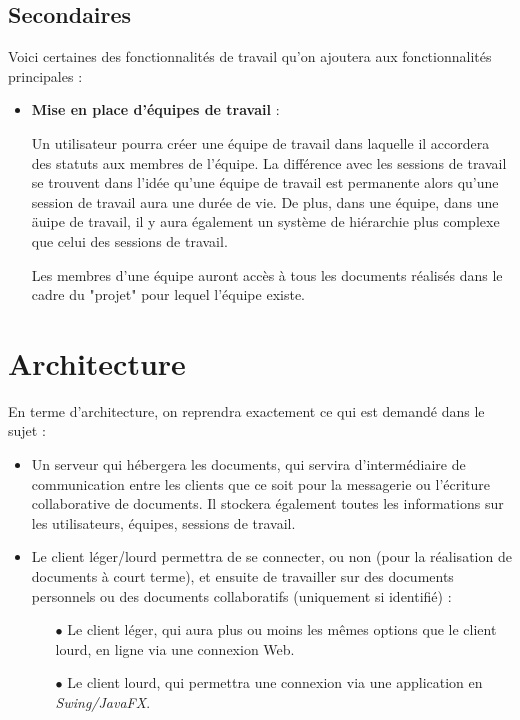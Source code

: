 	\newpage
	\subsection{Secondaires}
	
		Voici certaines des fonctionnalités de travail qu'on ajoutera aux fonctionnalités principales : \par 
		
		\begin{itemize}
		
			\item \textbf{Mise en place d'équipes de travail} : \par
			Un utilisateur pourra créer une équipe de travail dans laquelle il accordera des statuts aux membres de l'équipe. La différence avec les sessions de travail se trouvent dans l'idée qu'une équipe de travail est permanente alors qu'une session de travail aura une durée de vie. De plus, dans une équipe, dans une äuipe de travail, il y aura également un système de hiérarchie plus complexe que celui des sessions de travail. \par
			Les membres d'une équipe auront accès à tous les documents réalisés dans le cadre du "projet" pour lequel l'équipe existe.
		\end{itemize}
		
		\section{Architecture}
		
		En terme d'architecture, on reprendra exactement ce qui est demandé dans le sujet :
		
		\begin{itemize}
		
			\item Un serveur qui hébergera les documents, qui servira d'intermédiaire de communication entre les clients que ce soit pour la messagerie ou l'écriture collaborative de documents. Il stockera également toutes les informations sur les utilisateurs, équipes, sessions de travail.
			
			\item Le client léger/lourd permettra de se connecter, ou non (pour la réalisation de documents à court terme), et ensuite de travailler sur des documents personnels ou des documents collaboratifs (uniquement si identifié) : \par
			
			\begin{itemize}
			
				\item[$\bullet$] Le client léger, qui aura plus ou moins les mêmes options que le client lourd, en ligne via une connexion Web.
				
				\item[$\bullet$] Le client lourd, qui permettra une connexion via une application en \textsl{Swing/JavaFX}.
			\end{itemize}
		\end{itemize}
	\newpage
	
